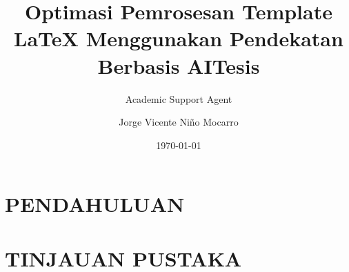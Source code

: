 \documentclass{book}
\title{Optimasi Pemrosesan Template LaTeX Menggunakan Pendekatan Berbasis AI}
\author{Academic Support Agent}
\date{\today}
\begin{document}
\maketitle

\begin{abstract}

\end{abstract}

\chapter{PENDAHULUAN}


\chapter{TINJAUAN PUSTAKA}


\usepackage[utf8]{inputenc}
\usepackage[T1]{fontenc}
\usepackage[spanish,es-tabla]{babel}
\usepackage{amsmath}
\usepackage{amsfonts}
\usepackage{amssymb}
\usepackage{graphicx}
\usepackage{wasysym}
\usepackage{lscape}
\usepackage[colorlinks=true, linkcolor=black,
citecolor=black, urlcolor=black,hidelinks]{hyperref}
\usepackage{float}
\usepackage{booktabs}
\usepackage{setspace} %
\usepackage{xcolor} %
\usepackage{lipsum} %
\usepackage{natbib}
\usepackage[left=2.54cm,top=2.54cm,right=2.54cm,,bottom=2.54cm]{geometry} %
\newcommand{\grad}{$^{\circ}$}
\author{Jorge Vicente Niño Mocarro} %
\title{Tesis} %
\end{document}
